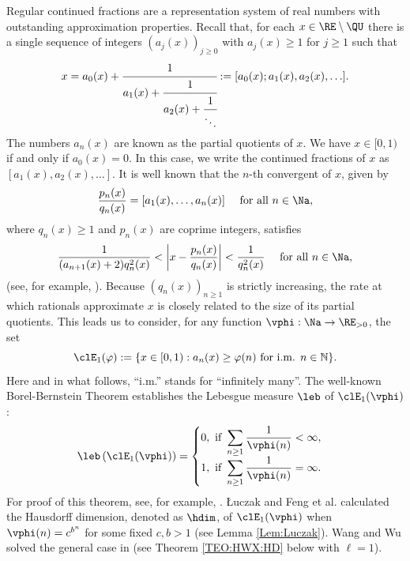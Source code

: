 \documentclass[12pt,a4paper]{amsart}
\begin{document}
Regular continued fractions are a representation system of real numbers with outstanding approximation properties. Recall that, for each $x\in \RE\setminus\QU$ there is a single sequence of integers $(a_j(x))_{j\geq 0}$ with $a_j(x)\geq 1$ for $j\geq 1$ such that
\[
x
=
a_0(x) + \cfrac{1}{a_1(x) + \cfrac{1}{a_2(x) + \cfrac{1}{\ddots}}}:=[a_0(x); a_1(x),a_2(x),\ldots].
\]
The numbers $a_n(x)$ are known as the partial quotients of $x$. We have $x\in [0,1)$ if and only if $a_0(x)=0$. In this case, we write the continued fractions of $x$ as $[a_1(x),a_2(x),\ldots]$. It is well known that the $n$-th convergent of $x$, given by
\[
\frac{p_n(x)}{q_n(x)}
=
[a_1(x),\ldots, a_n(x)]
\quad\text{ for all } n\in\Na,
\]
where $q_n(x)\geq 1$ and $p_n(x)$ are coprime integers, satisfies 
\[
\frac{1}{(a_{n+1}(x)+2)q_n^2(x)}
<
\left| x - \frac{p_n(x)}{q_n(x)}\right|
<
\frac{1}{q_n^2(x)}
\quad\text{ for all } n\in\Na,
\]
(see, for example, \cite[Equation (34)]{KhinchinCFBook}). Because  $(q_n(x))_{n\geq 1}$ is strictly increasing, the rate at which rationals approximate $x$ is closely related to the size of its partial quotients. This leads us to consider, for any function $\vphi:\Na\to\RE_{>0}$, the set
\[
\clE_1(\varphi)
:= \{x \in [0,1):a_n(x) \geq \varphi(n) \text{ for i.m. } n\in \mathbb{N}\}.
\]
Here and in what follows, ``i.m.'' stands for ``infinitely many''. The well-known Borel-Bernstein Theorem establishes the Lebesgue measure $\leb$ of $\clE_1(\vphi)$:
\[
\leb\left( \clE_1(\vphi) \right)
=
\begin{cases}
    0, \text{ if }  \displaystyle\sum_{n\geq 1} \frac{1}{\vphi(n)}<\infty,\\
    1, \text{ if }  \displaystyle\sum_{n\geq 1} \frac{1}{\vphi(n)}=\infty.\\
\end{cases}
\]
For proof of this theorem, see, for example, \cite[Theorem 1.11]{BugeaudBookCUP160}. {\L}uczak \cite{Luc1997} and Feng et al. \cite{FengWuLiang1997} calculated the Hausdorff dimension, denoted as $\hdim$, of $\clE_1(\vphi)$ when $\vphi(n)=c^{b^n}$ for some fixed $c,b>1$ (see Lemma \ref{Lem:Luczak}). Wang and Wu solved the general case in \cite{WangWu2008} (see Theorem \ref{TEO:HWX:HD} below with $\ell=1$).
\end{document}
